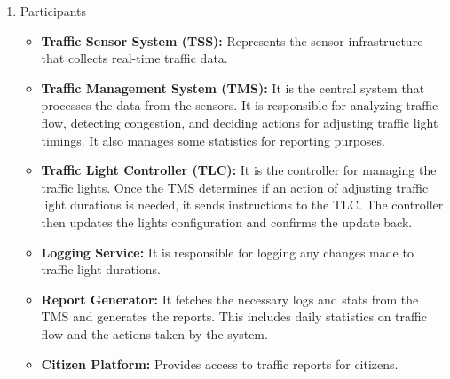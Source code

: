 \documentclass[11.5pt]{article}
\begin{document}
    \begin{enumerate}
        \item Participants
        \begin{itemize}
        \item \textbf{Traffic Sensor System (TSS):} Represents the sensor infrastructure that collects real-time traffic data.  
        \item \textbf{Traffic Management System (TMS):} It is the central system that processes the data from the sensors. It is responsible for analyzing traffic flow, detecting congestion, and deciding actions for adjusting traffic light timings. It also manages some statistics for reporting purposes.
        \item \textbf{Traffic Light Controller (TLC):} It is the controller for managing the traffic lights. Once the TMS determines if an action of adjusting traffic light durations is needed, it sends instructions to the TLC. The controller then updates the lights configuration and confirms the update back.
        \item \textbf{Logging Service:} It is responsible for logging any changes made to traffic light durations.
        \item \textbf{Report Generator:} It fetches the necessary logs and stats from the TMS and generates the reports. This includes daily statistics on traffic flow and the actions taken by the system.
        \item \textbf{Citizen Platform:} Provides access to traffic reports for citizens.
    \end{itemize}


\end{enumerate}
\end{document}
